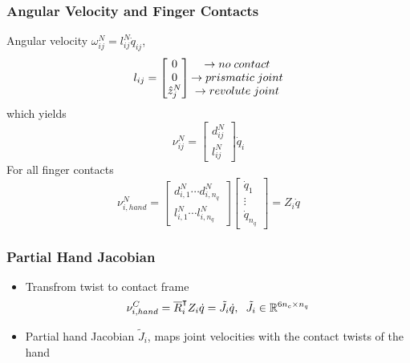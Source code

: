 \documentclass{beamer}
\begin{document}
\begin{frame}
\frametitle{Angular Velocity and Finger Contacts}
Angular velocity $\omega_{ij}^{N}=l_{ij}^{N}\dot{q}_{ij}$,
\begin{equation*}
l_{ij}=\begin{bmatrix}
0\\
0\\
\hat{z}_{j}^{N}
\end{bmatrix}
\begin{matrix}
\rightarrow no \hspace{.1cm} contact\\
\rightarrow prismatic \hspace{.1cm} joint\\
\rightarrow revolute \hspace{.1cm} joint
\end{matrix}
\end{equation*}
which yields 
\begin{equation*}
\nu_{ij}^N= \begin{bmatrix}
d_{ij}^N\\
l_{ij}^N
\end{bmatrix}\dot{q}_i
\end{equation*}
For all finger contacts
\begin{equation*}
\nu_{i,hand}^N= \begin{bmatrix}
d_{i,1}^N \cdots d_{i,n_q}^N\\
l_{i,1}^N \cdots l_{i,n_q}^N
\end{bmatrix}\begin{bmatrix}
\dot{q}_1\\
\vdots \\
\dot{q}_{n_q}
\end{bmatrix}=Z_i\dot{q}
\end{equation*}


\end{frame}

\begin{frame}
\frametitle{Partial Hand Jacobian}
\begin{itemize}
\item Transfrom twist to contact frame
\begin{equation*}
\nu_{i,hand}^C=\overline{R}_{i}^{\intercal} Z_i\dot{q}=\tilde{J}_i \dot{q}, \hspace{.2cm} \tilde{J}_i \in \mathbb{R}^{6n_c\times n_q}
\end{equation*}
\vspace{.2cm}
\item Partial hand Jacobian $\tilde{J}_i$, maps joint velocities with the contact twists of the hand
\end{itemize}

\end{frame}
\end{document}
